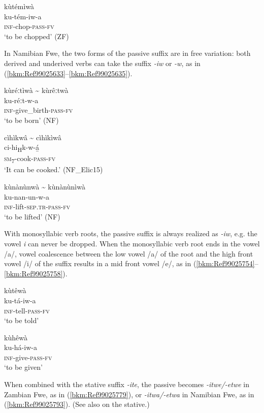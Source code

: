 \ea
\label{bkm:Ref463269276}
\glll kùtémìwà\\
ku-tém-iw-a\\
\textsc{inf}-chop-\textsc{pass}-\textsc{fv}\\
\glt ‘to be chopped’ (ZF)
\z

In Namibian Fwe, the two forms of the passive suffix are in free variation: both derived and underived verbs can take the suffix \textit{-iw} or \textit{-w}, as in (\ref{bkm:Ref99025633}--\ref{bkm:Ref99025635}).

\ea
\label{bkm:Ref99025633}
kùréːtìwà {\textasciitilde} kùrêːtwà\\
ku-réːt-w-a\\
\textsc{inf}-give\_birth-\textsc{pass}-\textsc{fv}\\
\glt ‘to be born’ (NF)
\z

\ea
cìhìkwâ {\textasciitilde} cìhìkìwâ\\
ci-hi\textsubscript{H}k-w-á̲\\
\textsc{sm}\textsubscript{7}-cook-\textsc{pass}-\textsc{fv}\\
\glt ‘It can be cooked.’ (NF\_Elic15)
\z

\ea
\label{bkm:Ref99025635}
kùnànùnwà {\textasciitilde} kùnànùnìwà\\
ku-nan-un-w-a\\
\textsc{inf}-lift-\textsc{sep}.\textsc{tr}-\textsc{pass}-\textsc{fv}\\
\glt ‘to be lifted’ (NF)
\z

With monosyllabic verb roots, the passive suffix is always realized as \textit{-iw}, e.g. the vowel \textit{i} can never be dropped. When the monosyllabic verb root ends in the vowel /a/, vowel coalescence between the low vowel /a/ of the root and the high front vowel /i/ of the suffix results in a mid front vowel /e/, as in (\ref{bkm:Ref99025754}--\ref{bkm:Ref99025758}).

\ea
\label{bkm:Ref99025754}
\glll kùtêwà\\
ku-tá-iw-a\\
\textsc{inf}-tell-\textsc{pass}-\textsc{fv}\\
\glt ‘to be told’
\z

\ea
\label{bkm:Ref99025758}
\glll kùhêwà\\
ku-há-iw-a\\
\textsc{inf}-give-\textsc{pass}-\textsc{fv}\\
\glt ‘to be given’
\z

When combined with the stative suffix \textit{-ite}, the passive becomes \textit{-itwe/-etwe} in Zambian Fwe, as in (\ref{bkm:Ref99025779}), or \textit{-itwa/-etwa} in Namibian Fwe, as in (\ref{bkm:Ref99025793}). (See also  on the stative.)

